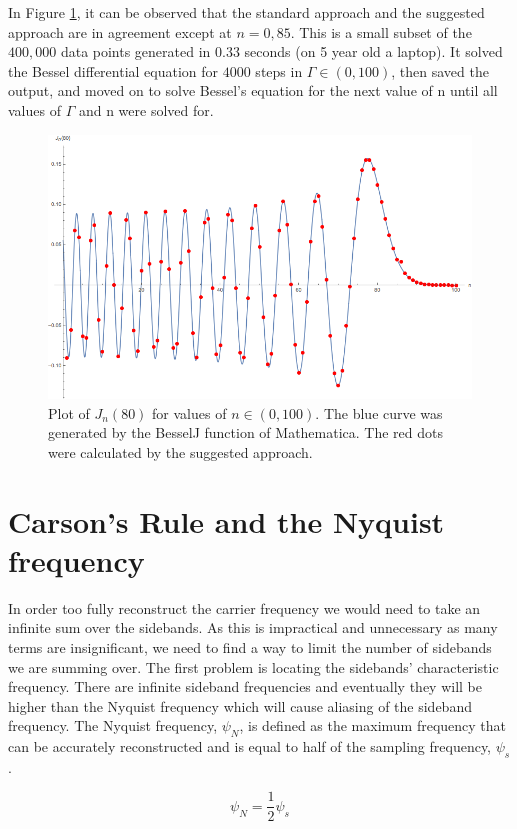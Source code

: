 \documentclass[onecolumn, groupedaddress, 10pt]{revtex4-1}
\begin{document}
In Figure \ref{fig:TA_bessel}, it can be observed that the standard approach and the suggested approach are in agreement except at $n=0,85$.  This is a small subset of the $400,000$ data points generated in $0.33$ seconds (on 5 year old a laptop).  It solved the Bessel differential equation for $4000$ steps in $\Gamma \in (0,100)$, then saved the output, and moved on to solve Bessel's equation for the next value of n until all values of $\Gamma$ and n were solved for.
\begin{figure}[H]
	\centering
	\includegraphics[width=.75\linewidth]{BesselJn80.png}
	\caption{\label{fig:TA_bessel}Plot of $J_n(80)$ for values of $n\in (0,100)$.  The blue curve was generated by the BesselJ function of Mathematica.  The red dots were calculated by the suggested approach.}
\end{figure}




\section{Carson's Rule and the Nyquist frequency}
In order too fully reconstruct the carrier frequency we would need to take an infinite sum over the sidebands. As this is impractical and unnecessary as many terms are insignificant, we need to find a way to limit the number of sidebands we are summing over. The first problem is locating the sidebands' characteristic frequency. There are infinite sideband frequencies and eventually they will be higher than the Nyquist frequency which will cause aliasing of the sideband frequency. The Nyquist frequency, $\psi_N$, is defined as the maximum frequency that can be accurately reconstructed and is equal to half of the sampling frequency, $\psi_s$.

\begin{equation}
\psi_N = \frac{1}{2}\psi_s
\end{equation}
\end{document}
